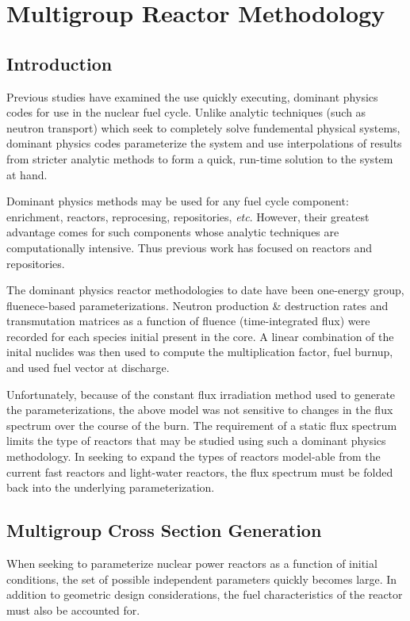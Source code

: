\chapter{Multigroup Reactor Methodology}

\section{Introduction}
Previous studies have examined the use quickly executing, dominant physics codes for use in the
nuclear fuel cycle.  Unlike analytic techniques (such as neutron transport) which seek to completely 
solve fundemental physical systems, dominant physics codes parameterize the system and use interpolations
of results from stricter analytic methods to form a quick, run-time solution to the system at hand.

Dominant physics methods may be used for any fuel cycle component: enrichment, reactors, reprocesing, 
repositories, \emph{etc}.  However, their greatest advantage comes for such components whose analytic
techniques are computationally intensive.  Thus previous work has focused on reactors and repositories.

The dominant physics reactor methodologies to date have been one-energy group, fluenece-based parameterizations.
Neutron production \& destruction rates and transmutation matrices as a function of fluence 
(time-integrated flux) were recorded for each species initial present in the core.  A linear combination of 
the inital nuclides was then used to compute the multiplication factor, fuel burnup, and used fuel 
vector at discharge.

Unfortunately, because of the constant flux irradiation method used to generate the parameterizations, 
the above model was not sensitive to changes in the flux spectrum over the course of the burn.  The 
requirement of a static flux spectrum limits the type of reactors that may be studied using such a 
dominant physics methodology.  In seeking to expand the types of reactors model-able from the 
current fast reactors and light-water reactors, the flux spectrum must be folded back into the 
underlying parameterization.


\section{Multigroup Cross Section Generation}
When seeking to parameterize nuclear power reactors as a function of initial conditions, 
the set of possible independent parameters quickly becomes large. In addition to geometric 
design considerations, the fuel characteristics of the reactor must also be accounted for.

